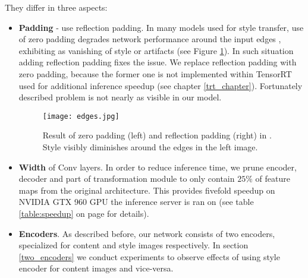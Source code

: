 \documentclass[../Main.tex]{subfiles}
\begin{document}
    They differ in three aspects:
    \begin{itemize}
        \item \textbf{Padding} - \cite{Li2018} use reflection padding. In many
        models used for style transfer, use of zero padding degrades network
        performance around the input edges \cite{johnson2016perceptual}, exhibiting as
        vanishing of style or artifacts (see Figure \ref{fig:edges}).
        In such situation adding reflection padding fixes the issue. We replace
        reflection padding with zero padding, because the former one is not 
        implemented within TensorRT used for additional inference speedup
        (see chapter \ref{trt_chapter}). Fortunately described problem is not nearly as visible
        in our model.
        \begin{figure}[h!]
            \texttt{[image: edges.jpg]}
            \caption{Result of zero padding (left) and reflection padding (right)
                in \cite{johnson2016perceptual}. Style visibly diminishes around
                the edges in the left image.
            }
            \label{fig:edges}
        \end{figure}
        \item \textbf{Width} of Conv layers. In order to reduce inference time,
        we prune encoder, decoder and part of transformation module
        to only contain $25\%$ of feature maps from the original architecture.
        This provides 
        fivefold speedup on NVIDIA GTX 960 GPU the inference server is ran on 
        (see table \ref{table:speedup} on page \pageref{table:speedup} for details).
        \item \textbf{Encoders}. As described before, our network consists of two encoders, specialized
        for content and style images respectively. In section \ref{two_encoders}
        we conduct experiments to observe effects of using style encoder for 
        content images and vice-versa.
        
    \end{itemize}
\end{document}

